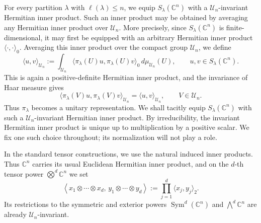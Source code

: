\documentclass[11pt,showkeys]{amsart}
\begin{document}
For every partition \(\lambda\) with \(\ell(\lambda)\leq n\), we equip \(S_\lambda(\mathbb C^n)\) with a
\(\mathcal U_n\)-invariant Hermitian inner product. Such an inner
product may be obtained by averaging any Hermitian inner product over
\(\mathcal U_n\).
More precisely, since \(S_\lambda(\mathbb C^n)\) is finite-dimensional, it may first
be equipped with an arbitrary Hermitian inner product
\(\langle\cdot,\cdot\rangle_0\). Averaging this inner product over the
compact group \(\mathcal U_n\), we define
\[
    \langle u,v\rangle_{\mathcal U_n}
    :=
    \int_{\mathcal U_n}
    \bigl\langle
        \pi_\lambda(U)u,\pi_\lambda(U)v
    \bigr\rangle_0
    \,d\mu_{\mathcal U_n}(U),
    \qquad
    u,v\in S_\lambda(\mathbb C^n).
\]
This is
again a positive-definite Hermitian inner product, and the invariance
of Haar measure gives
\[
    \bigl\langle
        \pi_\lambda(V)u,\pi_\lambda(V)v
    \bigr\rangle_{\mathcal U_n}
    =
    \langle u,v\rangle_{\mathcal U_n},
    \qquad V\in\mathcal U_n.
\]
Thus \(\pi_\lambda\) becomes a unitary representation. We shall tacitly
equip \(S_\lambda(\mathbb C^n)\) with such a
\(\mathcal U_n\)-invariant Hermitian inner product.
By irreducibility, the invariant Hermitian inner product is unique
up to multiplication by a positive scalar. We fix one such choice
throughout; its normalization will not play a role.

In the standard tensor constructions, we use the natural induced
inner products. Thus \(\mathbb C^n\) carries its usual Euclidean
Hermitian inner product, and on the $d$-th tensor power $\bigotimes\nolimits^{d}\mathbb C^n$ we set
\[
    \left\langle
        x_1\otimes\cdots\otimes x_d,\,
        y_1\otimes\cdots\otimes y_d
    \right\rangle
    :=
    \prod_{j=1}^d\langle x_j,y_j\rangle_2.
\]
Its restrictions to the symmetric and exterior powers
    $\operatorname{Sym}^d(\mathbb C^n)$
   and
    $\bigwedge\nolimits^d\mathbb C^n$
are already \(\mathcal U_n\)-invariant.
\end{document}
